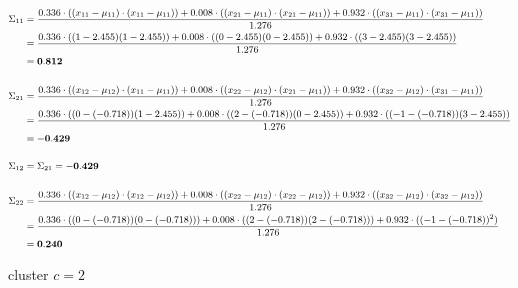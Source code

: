 \documentclass[12pt]{article}
\begin{document}
\begin{enumerate}
        \begin{equation*}
            \fontsize{9pt}{10pt}\selectfont
            \begin{aligned}
                \Sigma_{11} &= \frac{0.336 \cdot ((x_{11}-\mu_{11}) \cdot (x_{11} - \mu_{11}))+ 0.008 \cdot ((x_{21}-\mu_{11}) \cdot (x_{21} - \mu_{11}))+ 0.932 \cdot ((x_{31}-\mu_{11}) \cdot (x_{31} - \mu_{11}))}{1.276}\\
                &=\frac{0.336 \cdot ((1-2.455)(1-2.455)) + 0.008  \cdot ((0-2.455)(0-2.455)) + 0.932 \cdot ((3-2.455)(3-2.455))}{1.276} \\
                &= \mathbf{0.812}\\
                \\
                \Sigma_{21} &= \frac{0.336 \cdot ((x_{12}-\mu_{12}) \cdot (x_{11} - \mu_{11}))+ 0.008 \cdot ((x_{22}-\mu_{12}) \cdot (x_{21} - \mu_{11}))+ 0.932 \cdot ((x_{32}-\mu_{12}) \cdot (x_{31} - \mu_{11}))}{1.276}\\
                &=\frac{0.336 \cdot ((0-(-0.718))(1 - 2.455)) + 0.008 \cdot ((2-(-0.718))(0 - 2.455)) + 0.932 \cdot ((-1-(-0.718))(3-2.455))}{1.276} \\
                &= \mathbf{-0.429}\\
                \\
                \Sigma_{12} &= \Sigma_{21} = \mathbf{-0.429}\\
                \\
                \Sigma_{22} &= \frac{0.336 \cdot ((x_{12}-\mu_{12}) \cdot (x_{12} - \mu_{12}))+ 0.008 \cdot ((x_{22}-\mu_{12}) \cdot (x_{22} - \mu_{12}))+ 0.932 \cdot ((x_{32}-\mu_{12}) \cdot (x_{32} - \mu_{12}))}{1.276}\\
                &=\frac{0.336 \cdot ((0-(-0.718))(0-(-0.718))) + 0.008 \cdot ((2-(-0.718))(2-(-0.718))) + 0.932 \cdot ((-1-(-0.718))^2)}{1.276}\\
                &= \mathbf{0.240}\\
            \end{aligned}
        \end{equation*}

    \vspace{20pt}
     {cluster $c=2$}


\end{enumerate}
\end{document}
